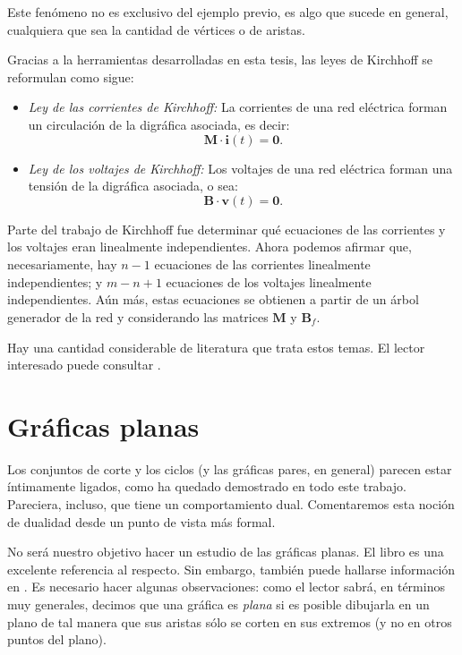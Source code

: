 Este fenómeno no es exclusivo del ejemplo previo, es algo que sucede en general, cualquiera que sea la cantidad de vértices o de aristas.

Gracias a la herramientas desarrolladas en esta tesis, las leyes de Kirchhoff se reformulan como sigue:

\begin{itemize}
    \item \textit{Ley de las corrientes de Kirchhoff:} La corrientes de una red eléctrica forman un circulación de la digráfica asociada, es decir: $$
    \mathbf{M}\cdot\mathbf{i}(t) = \mathbf{0}.$$
    
    \item \textit{Ley de los voltajes de Kirchhoff:} Los voltajes de una red eléctrica forman una tensión de la digráfica asociada, o sea: $$
    \mathbf{B}\cdot\mathbf{v}(t) = \mathbf{0}.$$
\end{itemize}


Parte del trabajo de Kirchhoff fue determinar qué ecuaciones de las corrientes y los voltajes eran linealmente independientes. Ahora podemos afirmar que, necesariamente, hay $n-1$ ecuaciones de las corrientes linealmente independientes; y $m -n +1$ ecuaciones de los voltajes linealmente independientes. Aún más, estas ecuaciones se obtienen a partir de un árbol generador de la red y considerando las matrices $\widehat{\mathbf{M}}$ y $\mathbf{B}_{f}$. 

Hay una cantidad considerable de literatura que trata estos temas. El lector interesado puede consultar \cite{Deo,Seshu,Slepian,Chen}.

\section{Gráficas planas}

Los conjuntos de corte y los ciclos (y las gráficas pares, en general) parecen estar íntimamente ligados, como ha quedado demostrado en todo este trabajo. Pareciera, incluso, que tiene un comportamiento dual. Comentaremos esta noción de dualidad desde un punto de vista más formal.

No será nuestro objetivo hacer un estudio de las gráficas planas. El libro \cite{Bondy} es una excelente referencia al respecto. Sin embargo, también puede hallarse información en \cite{Chen,Deo,Diestel,Seshu,Gross}. Es necesario hacer algunas observaciones: como el lector sabrá, en términos muy generales, decimos que una gráfica es \textit{plana} si es posible dibujarla en un plano de tal manera que sus aristas sólo se corten en sus extremos (y no en otros puntos del plano).

